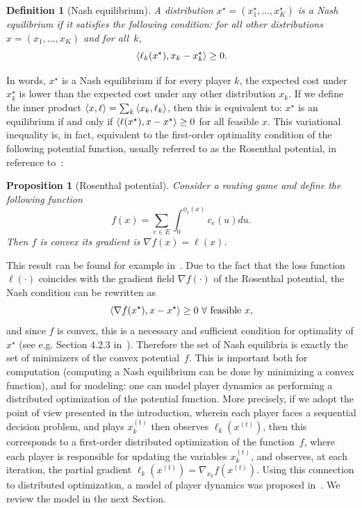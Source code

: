\documentclass{sig-alternate-ipsn13}
\newtheorem{definition}{Definition}
\newtheorem{proposition}{Proposition}
\begin{document}
\begin{definition}[Nash equilibrium]
A distribution $x^\star = (x_1^\star, \dots, x_K^\star)$ is a Nash equilibrium if it satisfies the following condition: for all other distributions $x = (x_1, \dots, x_K)$ and for all~$k$,
\[
\left\langle \ell_k(x^\star), x_k - x_k^\star \right\rangle \geq 0.
\]
\end{definition}
In words, $x^\star$ is a Nash equilibrium if for every player $k$, the expected cost under $x_k^\star$ is lower than the expected cost under any other distribution $x_k$. If we define the inner product $\left\langle x, \ell \right\rangle = \sum_{k} \left\langle x_k, \ell_k \right\rangle$, then this is equivalent to: $x^\star$ is an equilibrium if and only if $\left\langle \ell(x^\star), x - x^\star \right\rangle \geq 0$ for all feasible $x$. This variational inequality is, in fact, equivalent to the first-order optimality condition of the following potential function, usually referred to as the Rosenthal potential, in reference to~\cite{rosenthal1973class}:
\begin{proposition}[Rosenthal potential]
Consider a routing game and define the following function
\[
f(x) = \sum_{e \in E} \int_0^{\phi_e(x)} c_e(u)du.
\]
Then $f$ is convex its gradient is $\nabla f(x) = \ell(x)$.
\end{proposition}
This result can be found for example in~\cite{roughgarden2002bad}. Due to the fact that the loss function $\ell(\cdot)$ coincides with the gradient field $\nabla f(\cdot)$ of the Rosenthal potential, the Nash condition can be rewritten as
\[
\braket{\nabla f(x^\star)}{x - x^\star} \geq 0 \ \forall \text{ feasible }x,
\]
and since $f$ is convex, this is a necessary and sufficient condition for optimality of $x^\star$ (see e.g. Section 4.2.3 in~\cite{boyd2010convex}). Therefore the set of Nash equilibria is exactly the set of minimizers of the convex potential~$f$. This is important both for computation (computing a Nash equilibrium can be done by minimizing a convex function), and for modeling: one can model player dynamics as performing a distributed optimization of the potential function. More precisely, if we adopt the point of view presented in the introduction, wherein each player faces a sequential decision problem, and plays $x^{(t)}_k$ then observes $\ell_k(x^{(t)})$, then this corresponds to a first-order distributed optimization of the function~$f$, where each player is responsible for updating the variables $x_k^{(t)}$, and observes, at each iteration, the partial gradient $\ell_k(x^{(t)}) = \nabla_{x_k} f(x^{(t)})$. Using this connection to distributed optimization, a model of player dynamics was proposed in~\cite{krichene2015MD}. We review the model in the next Section.
\end{document}
